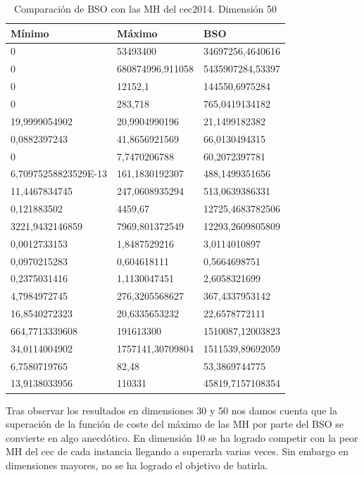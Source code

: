 \begin{table}[htbp]
	\begin{center}
		\begin{tabular}{|l|l|l|}
			\hline
			Mínimo & Máximo & BSO \\
			\hline \hline
			0 & 53493400 & 34697256,4640616 \\ \hline
			0 & 680874996,911058 & 5435907284,53397 \\ \hline
			0 & 12152,1 & 144550,6975284 \\ \hline
			0 & 283,718 & 765,0419134182 \\ \hline
			19,9999054902 & 20,9904990196 & 21,1499182382 \\ \hline
			0,0882397243 & 41,8656921569 & 66,0130494315 \\ \hline
			0 & 7,7470206788 & 60,2072397781 \\ \hline
			6,70975258823529E-13 & 161,1830192307 & 488,1499351656 \\ \hline
			11,4467834745 & 247,0608935294 & 513,0639386331 \\ \hline
			0,121883502 & 4459,67 & 12725,4683782506 \\ \hline
			3221,9432146859 & 7969,801372549 & 12293,2609805809 \\ \hline
			0,0012733153 & 1,8487529216 & 3,0114010897 \\ \hline
			0,0970215283 & 0,604618111 & 0,5664698751 \\ \hline
			0,2375031416 & 1,1130047451 & 2,6058321699 \\ \hline
			4,7984972745 & 276,3205568627 & 367,4337953142 \\ \hline
			16,8540272323 & 20,6335653232 & 22,6578772111 \\ \hline
			664,7713339608 & 191613300 & 1510087,12003823 \\ \hline
			34,0114004902 & 1757141,30709804 & 1511539,89692059 \\ \hline
			6,7580719765 & 82,48 & 53,3869744775 \\ \hline
			13,9138033956 & 110331 & 45819,7157108354 \\ \hline


		\end{tabular}
		\caption{Comparación de BSO con las MH del cec2014. Dimensión 50}
		\label{tabla:Dimension50Comparativa}
	\end{center}
\end{table}

\newpage

Tras observar los resultados en dimensiones 30 y 50 nos damos cuenta que la superación de la función de coste del máximo de las MH por parte del BSO se convierte en algo anecdótico. En dimensión 10 se ha logrado competir con la peor MH del cec de cada instancia llegando a superarla varias veces. Sin embargo en dimensiones mayores, no se ha logrado el objetivo de batirla.
\newpage


